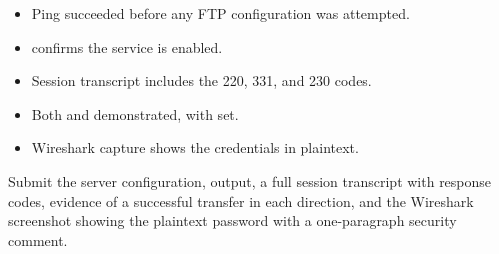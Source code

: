 \begin{verification}
\begin{itemize}
  \item Ping succeeded before any FTP configuration was attempted.
  \item {} confirms the service is enabled.
  \item Session transcript includes the 220, 331, and 230 codes.
  \item Both  and  demonstrated, with  set.
  \item Wireshark capture shows the credentials in plaintext.
\end{itemize}
\end{verification}

\begin{labdeliverable}
Submit the server configuration,  output, a full session transcript with response codes, evidence of a successful transfer in each direction, and the Wireshark screenshot showing the plaintext password with a one-paragraph security comment.
\end{labdeliverable}
